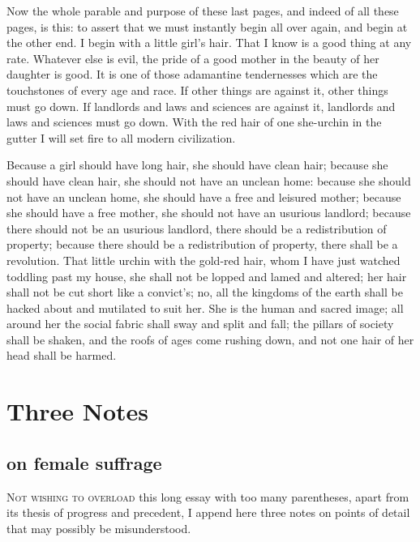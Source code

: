 \documentclass[final,10pt,letterpaper,twocolumn,openany]{book}
\newcommand{\dcap}[2]{
	 \lettrine[nindent=0em,findent=2pt,lines=3,loversize=.15,lraise=0]{#1}{#2}
 }
\begin{document}
Now the whole parable and purpose of these last pages, and indeed of
all these pages, is this: to assert that we must instantly begin all over again,
and begin at the other end. I begin with a little girl's hair. That I know is a
good thing at any rate. Whatever else is evil, the pride of a good mother in
the beauty of her daughter is good. It is one of those adamantine
tendernesses which are the touchstones of every age and race. If other
things are against it, other things must go down. If landlords and laws and
sciences are against it, landlords and laws and sciences must go down.
With the red hair of one she-urchin in the gutter I will set fire to all
modern civilization. 

Because a girl should have long hair, she should have
clean hair; because she should have clean hair, she should not have an
unclean home: because she should not have an unclean home, she should
have a free and leisured mother; because she should have a free mother,
she should not have an usurious landlord; because there should not be an
usurious landlord, there should be a redistribution of property; because
there should be a redistribution of property, there shall be a revolution.
That little urchin with the gold-red hair, whom I have just watched
toddling past my house, she shall not be lopped and lamed and altered; her
hair shall not be cut short like a convict's; no, all the kingdoms of the earth
shall be hacked about and mutilated to suit her. She is the human and
sacred image; all around her the social fabric shall sway and split and fall;
the pillars of society shall be shaken, and the roofs of ages come rushing
down, and not one hair of her head shall be harmed.

\chapter{ Three Notes }

\section{on female suffrage}

   \dcap{N}{ot wishing to overload}this long essay with too many parentheses,
apart from its thesis of progress and precedent, I append here three notes
on points of detail that may possibly be misunderstood.
\end{document}
